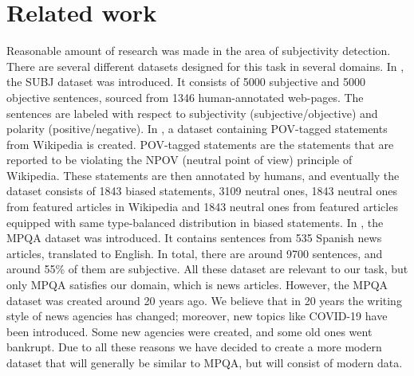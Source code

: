 \documentclass[conference]{IEEEtran}
\begin{document}
\section{Related work}
Reasonable amount of research was made in the area of subjectivity detection. There are several different datasets designed for this task in several domains. In \cite{subj}, the SUBJ dataset was introduced. It consists of 5000 subjective and 5000 objective sentences, sourced from 1346 human-annotated web-pages. The sentences are labeled with respect to subjectivity (subjective/objective) and polarity (positive/negative). In \cite{wikipedia-biased-statements}, a dataset containing POV-tagged statements from Wikipedia is created. POV-tagged statements are the statements that are reported to be violating the NPOV (neutral point of view) principle of Wikipedia. These statements are then annotated by humans, and eventually the dataset consists of 1843 biased statements, 3109 neutral ones, 1843 neutral ones from featured articles in Wikipedia and 1843 neutral ones from featured articles equipped with same type-balanced distribution in biased statements. In \cite{mpqa}, the MPQA dataset was introduced. It contains sentences from 535 Spanish news articles, translated to English. In total, there are around 9700 sentences, and around 55\% of them are subjective. All these dataset are relevant to our task, but only MPQA satisfies our domain, which is news articles. However, the MPQA dataset was created around 20 years ago. We believe that in 20 years the writing style of news agencies has changed; moreover, new topics like COVID-19 have been introduced. Some new agencies were created, and some old ones went bankrupt. Due to all these reasons we have decided to create a more modern dataset that will generally be similar to MPQA, but will consist of modern data.
\end{document}
